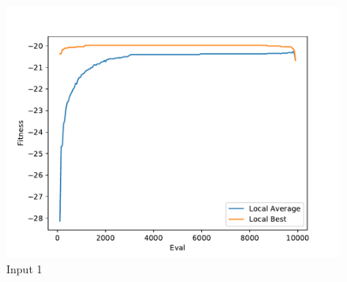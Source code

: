 \documentclass{standalone}
\begin{document}
\begin{figure}[!htb]
	\caption{Input 1}
	\label{fig:graph_1036}
	\includegraphics[width=\textwidth]{../graphs/graphs/1036.pdf}
\end{figure}
\end{document}

